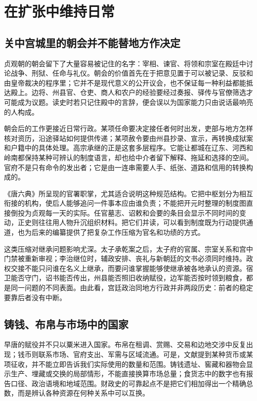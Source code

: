 \section{在扩张中维持日常}
\label{sec:early-tang-acceptance-depth-pages}

\subsection{关中宫城里的朝会并不能替地方作决定}
贞观朝的朝会留下了大量容易被记住的名字：宰相、谏官、将领和宗室在殿廷中讨论战争、刑狱、任命与礼仪。朝会的价值首先在于把意见置于可以被记录、反驳和由皇帝裁决的程序里；它并不是现代意义的公开议会，也不保证每一种利益都能抵达殿上。边将、州县官、仓吏、商人和农户的经验要经过奏报、驿传与官僚筛选才可能成为议题。读史时若只记住殿中的言辞，便会误以为国家能力只由说话最响亮的人构成。

朝会后的工作更接近日常行政。某项任命要决定接任者何时出发，吏部与地方怎样核对资历，沿途驿站如何提供传递；某项赦令要由州县抄录、宣示，再转换成狱案和户籍中的具体处理。高宗承继的正是这套多层程序。它能让都城在辽东、河西和岭南都保持某种可辨认的制度语言，却也给中介者留下解释、拖延和选择的空间。官府不是只有命令的发出者；它是由一连串需要人手、纸张、道路和信用的转换构成的。

《唐六典》所呈现的官署职掌，尤其适合说明这种规范结构。它把中枢划分为相互衔接的机构，使后人能够追问一件事本应由谁负责；不能把开元时整理的制度图直接倒投为贞观每一天的实际。任官墓志、诏敕和会要的条目会显示不同时间的变动，正史则往往用人物升沉组织材料。把它们并读，可以看到制度既为行动提供通道，也为后来的编纂提供了把复杂工作压缩为官名和功绩的方式。

这类压缩对继承问题影响尤深。太子承乾案之后，太子府的官属、宗室关系和宫中门禁被重新审视；李治继位时，辅政安排、丧礼与新朝廷的文书必须同时维持。政权交接不能只问谁在名义上继承，而要问谁掌握能够使继承被各地承认的资源。宿卫能否守门，诏书能否传出，州县能否照旧收纳赋役，边军能否按时领到粮食，都是同一问题的不同表面。由此看，宫廷政治同地方行政并非两段历史：前者的稳定要靠后者没有中断。

\subsection{铸钱、布帛与市场中的国家}
早唐的赋役并不只以粟米进入国家。布帛在租调、赏赐、交易和边地交涉中反复出现；钱币则联系市场、官府支出、军需与区域流通。可是，文献提到某种货币或某项征收，并不能立即告诉我们实际使用的数量和范围。铸钱遗址、窖藏和器物会显示生产、埋藏或交换的局部情形，不能直接换算市场总量；食货志中的数字也有报告口径、政治语境和地域范围。财政史的可靠起点不是把它们相加得出一个精确总数，而是辨认各种资源在何种关系中可以互换。

